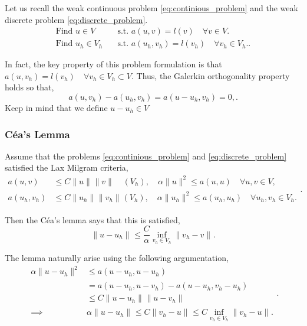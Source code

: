 Let us recall the weak continuous problem \eqref{eq:continious_problem} and the weak discrete problem \eqref{eq:discrete_problem}.
\begin{align}
    \label{eq:continious_problem}
    \text{Find } u \in V \quad&  \text{s.t. } a\left( u,v \right) = l\left( v \right)  \quad \forall v \in V. \\
    \label{eq:discrete_problem}
    \text{Find } u_h \in V_h \quad&  \text{s.t. } a\left( u_h,v_h \right) = l\left( v_h \right)  \quad \forall v_h \in V_h.
.\end{align}

In fact, the key property of this problem formulation is that $a\left( u, v_{h} \right)  = l \left( v_{h} \right) \quad  \forall v_{h} \in V_{h} \subset V  $. Thus, the Galerkin orthogonality property holds so that,
$$
a\left( u, v_{h} \right)  - a\left( u_{h}, v_{h} \right) = a\left( u- u_{h}, v_{h} \right) = 0,   . $$
Keep in mind that we define
$ u - u_{h} \in V$
\subsubsection{Céa's Lemma }%
\label{ssub:ceas_lemma}

Assume that the problems \eqref{eq:continious_problem} and \eqref{eq:discrete_problem} satisfied the Lax Milgram criteria,
\begin{equation*}
    \begin{split}
a\left( u,v \right)  & \le C \| u \|_{  }^{  }  \| v \|_{  }^{  }  \quad   \left( V_{h} \right) , \quad  \alpha \|  u\|_{   }^{     2} \le a \left( u,u \right) \quad \forall u,v\in V, \\
a\left( u_{h},v_{h} \right)  & \le C \| u_{h} \|_{  }^{  }  \| v_{h} \|_{  }^{  }   \left( V_{h} \right) , \quad  \alpha \| u_{h}\|_{   }^{     2} \le a \left( u_{h},u_{h} \right)\quad  \forall u_{h},v_{h}\in V_{h}.
    \end{split}
.\end{equation*}

Then the Céa's lemma says that this is satisfied,
\begin{equation}
\label{eq:Ceas_lemma_continious}
\| u - u_{h} \|_{  }^{  } \le \frac{C}{\alpha }  \inf_{v_{h} \in V_{h}} \| v_{h} - v \|_{  }^{  } .
\end{equation}

The lemma naturally arise using the following argumentation,
\begin{equation}
\label{eq:cealemma_proof}
    \begin{split}
\alpha \| u - u_{h} \|_{  }^{  2} & \le a\left( u-u_{h}, u - u_{h} \right) \\
&= a\left( u - u_{h}, u - v_{h} \right)  - a\left( u - u_{h}, v_{h} - u_{h} \right)  \\
& \le  C\| u - u_{h} \|_{  }^{  } \| u - v_{h} \|_{  }^{  } \\
\implies &  \alpha \| u - u_{h} \|_{  }^{  }    \le  C \| v_{h} - u \|_{  }^{  } \le C \inf_{v_{h} \in V_{h}} \| v_{h} -u \|_{  }^{  }.
    \end{split}
.\end{equation}

